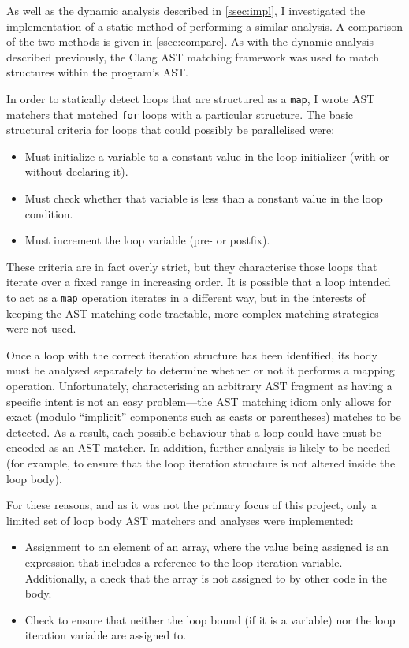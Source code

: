 \documentclass[journal]{IEEEtran}
\begin{document}
As well as the dynamic analysis described in \autoref{ssec:impl}, I investigated
the implementation of a static method of performing a similar analysis. A
comparison of the two methods is given in \autoref{ssec:compare}. As with the
dynamic analysis described previously, the Clang AST matching framework was used
to match structures within the program's AST.

In order to statically detect loops that are structured as a \texttt{map}, I
wrote AST matchers that matched \texttt{for} loops with a particular structure.
The basic structural criteria for loops that could possibly be parallelised
were:

\begin{itemize}
  \item Must initialize a variable to a constant value in the loop initializer
    (with or without declaring it).
  \item Must check whether that variable is less than a constant value in the
    loop condition.
  \item Must increment the loop variable (pre- or postfix).
\end{itemize}

These criteria are in fact overly strict, but they characterise those loops that
iterate over a fixed range in increasing order. It is possible that a loop
intended to act as a \texttt{map} operation iterates in a different way, but in
the interests of keeping the AST matching code tractable, more complex matching
strategies were not used.

Once a loop with the correct iteration structure has been identified, its body
must be analysed separately to determine whether or not it performs a mapping
operation. Unfortunately, characterising an arbitrary AST fragment as having a
specific intent is not an easy problem---the AST matching idiom only allows for
exact (modulo ``implicit'' components such as casts or parentheses) matches to
be detected. As a result, each possible behaviour that a loop could have must
be encoded as an AST matcher. In addition, further analysis is likely to be
needed (for example, to ensure that the loop iteration structure is not altered
inside the loop body).

For these reasons, and as it was not the primary focus of this project, only a
limited set of loop body AST matchers and analyses were implemented:

\begin{itemize}
  \item Assignment to an element of an array, where the value being assigned is
    an expression that includes a reference to the loop iteration variable.
    Additionally, a check that the array is not assigned to by other code in the
    body.
  \item Check to ensure that neither the loop bound (if it is a variable) nor
    the loop iteration variable are assigned to.
\end{itemize}
\end{document}
